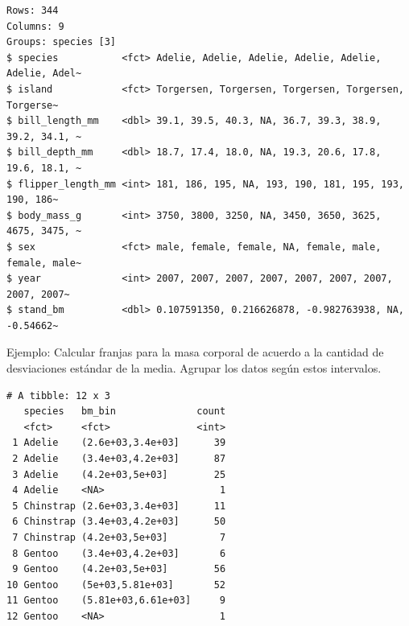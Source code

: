 \documentclass[
  letterpaper,
  DIV=11,
  numbers=noendperiod]{scrreprt}
\newenvironment{Shaded}{\begin{snugshade}}{\end{snugshade}}
\newcommand{\AttributeTok}[1]{\textcolor[rgb]{0.40,0.45,0.13}{#1}}
\newcommand{\DecValTok}[1]{\textcolor[rgb]{0.68,0.00,0.00}{#1}}
\newcommand{\FunctionTok}[1]{\textcolor[rgb]{0.28,0.35,0.67}{#1}}
\newcommand{\NormalTok}[1]{\textcolor[rgb]{0.00,0.23,0.31}{#1}}
\newcommand{\OtherTok}[1]{\textcolor[rgb]{0.00,0.23,0.31}{#1}}
\newcommand{\SpecialCharTok}[1]{\textcolor[rgb]{0.37,0.37,0.37}{#1}}
\newcommand{\StringTok}[1]{\textcolor[rgb]{0.13,0.47,0.30}{#1}}
\begin{document}
\begin{verbatim}
Rows: 344
Columns: 9
Groups: species [3]
$ species           <fct> Adelie, Adelie, Adelie, Adelie, Adelie, Adelie, Adel~
$ island            <fct> Torgersen, Torgersen, Torgersen, Torgersen, Torgerse~
$ bill_length_mm    <dbl> 39.1, 39.5, 40.3, NA, 36.7, 39.3, 38.9, 39.2, 34.1, ~
$ bill_depth_mm     <dbl> 18.7, 17.4, 18.0, NA, 19.3, 20.6, 17.8, 19.6, 18.1, ~
$ flipper_length_mm <int> 181, 186, 195, NA, 193, 190, 181, 195, 193, 190, 186~
$ body_mass_g       <int> 3750, 3800, 3250, NA, 3450, 3650, 3625, 4675, 3475, ~
$ sex               <fct> male, female, female, NA, female, male, female, male~
$ year              <int> 2007, 2007, 2007, 2007, 2007, 2007, 2007, 2007, 2007~
$ stand_bm          <dbl> 0.107591350, 0.216626878, -0.982763938, NA, -0.54662~
\end{verbatim}

{Ejemplo}: Calcular franjas para la masa corporal de acuerdo a la
cantidad de desviaciones estándar de la media. Agrupar los datos según
estos intervalos.

\begin{Shaded}
\end{Shaded}

\begin{verbatim}
# A tibble: 12 x 3
   species   bm_bin              count
   <fct>     <fct>               <int>
 1 Adelie    (2.6e+03,3.4e+03]      39
 2 Adelie    (3.4e+03,4.2e+03]      87
 3 Adelie    (4.2e+03,5e+03]        25
 4 Adelie    <NA>                    1
 5 Chinstrap (2.6e+03,3.4e+03]      11
 6 Chinstrap (3.4e+03,4.2e+03]      50
 7 Chinstrap (4.2e+03,5e+03]         7
 8 Gentoo    (3.4e+03,4.2e+03]       6
 9 Gentoo    (4.2e+03,5e+03]        56
10 Gentoo    (5e+03,5.81e+03]       52
11 Gentoo    (5.81e+03,6.61e+03]     9
12 Gentoo    <NA>                    1
\end{verbatim}
\end{document}
